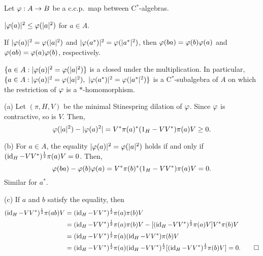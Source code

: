 \documentclass{../../../small}
\begin{document}
\begin{prop}
Let $\varphi:A\to B$ be a c.c.p.~map between C$^*$-algebras.
\begin{parts}
\item $|\varphi(a)|^2\le\varphi(|a|^2)$ for $a\in A$.
\item If $|\varphi(a)|^2=\varphi(|a|^2)$ and $|\varphi(a^*)|^2=\varphi(|a^*|^2)$, then $\varphi(ba)=\varphi(b)\varphi(a)$ and $\varphi(ab)=\varphi(a)\varphi(b)$, respectively.
\item $\{a\in A:|\varphi(a)|^2=\varphi(|a|^2)\}$ is a closed under the multiplication.
In particular, $\{a\in A:|\f(a)|^2=\f(|a|^2),\ |\f(a^*)|^2=\f(|a^*|^2)\}$ is a C$^*$-subalgebra of $A$ on which the restriction of $\varphi$ is a $*$-homomorphism.
\end{parts}
\end{prop}
\begin{pf}
(a)
Let $(\pi,H,V)$ be the minimal Stinespring dilation of $\varphi$.
Since $\varphi$ is contractive, so is $V$.
Then,
\[\varphi(|a|^2)-|\varphi(a)^2|=V^*\pi(a)^*(1_H-VV^*)\pi(a)V\ge0.\]

(b)
For $a\in A$, the equality $|\varphi(a)|^2=\varphi(|a|^2)$ holds if and only if $(\operatorname{id}_H-VV^*)^{\frac12}\pi(a)V=0$.
Then,
\[\varphi(ba)-\varphi(b)\varphi(a)=V^*\pi(b)^*(1_H-VV^*)\pi(a)V=0.\]
Similar for $a^*$.

(c)
If $a$ and $b$ satisfy the equality, then
\begin{align*}
(\operatorname{id}_H-VV^*)^{\frac12}\pi(ab)V
&=(\operatorname{id}_H-VV^*)^{\frac12}\pi(a)\pi(b)V\\
&=(\operatorname{id}_H-VV^*)^{\frac12}\pi(a)\pi(b)V-[(\operatorname{id}_H-VV^*)^{\frac12}\pi(a)V]V^*\pi(b)V\\
&=(\operatorname{id}_H-VV^*)^{\frac12}\pi(a)(\operatorname{id}_H-VV^*)\pi(b)V\\
&=(\operatorname{id}_H-VV^*)^{\frac12}\pi(a)(\operatorname{id}_H-VV^*)^{\frac12}[(\operatorname{id}_H-VV^*)^{\frac12}\pi(b)V]=0.\qedhere
\end{align*}
\end{pf}
\end{document}
